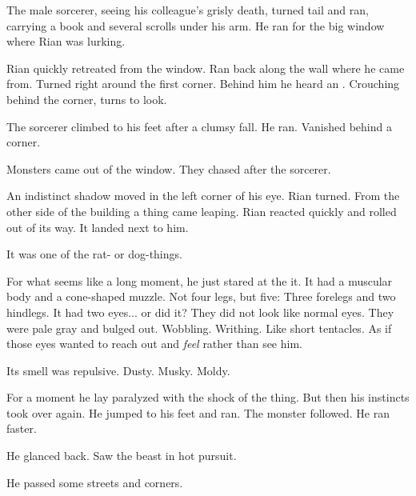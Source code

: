 The male sorcerer, seeing his colleague's grisly death, turned tail and ran, carrying a book and several scrolls under his arm. 
He ran for the big window where Rian was lurking. 


Rian quickly retreated from the window. 
Ran back along the wall where he came from. 
Turned right around the first corner. 
Behind him he heard an . 
Crouching behind the corner, turns to look. 

The sorcerer climbed to his feet after a clumsy fall. 
He ran. 
Vanished behind a corner. 

Monsters came out of the window. 
They chased after the sorcerer. 


\begin{comment}
\subsection{Rian chased by \grimrat}
\end{comment}

An indistinct shadow moved in the left corner of his eye. 
Rian turned. 
From the other side of the building a thing came leaping. 
Rian reacted quickly and rolled out of its way. 
It landed next to him. 

It was one of the rat- or dog-things. 

For what seems like a long moment, he just stared at the it. 
It had a muscular body and a cone-shaped muzzle. 
Not four legs, but five: Three forelegs and two hindlegs. 
It had two eyes... or did it?
They did not look like normal eyes. 
They were pale gray and bulged out. 
Wobbling. 
Writhing. 
Like short tentacles. 
As if those eyes wanted to reach out and \emph{feel} rather than see him. 

Its smell was repulsive. 
Dusty. 
Musky. 
Moldy. 

For a moment he lay paralyzed with the shock of the thing. 
But then his instincts took over again. 
He jumped to his feet and ran. 
The monster followed. 
He ran faster. 

He glanced back. 
Saw the beast in hot pursuit. 

He passed some streets and corners. 

